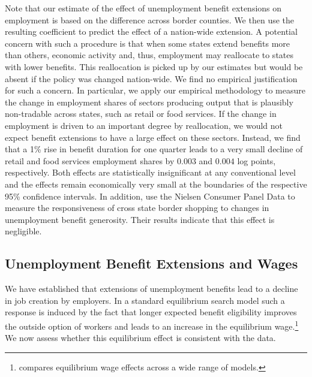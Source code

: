 \documentclass[12pt]{article}
\newcommand{\1}{\mathbf{1}}
\begin{document}
Note that our estimate of the effect of unemployment benefit extensions on employment is based on the difference across border counties. We then use the resulting coefficient to predict the effect of a nation-wide extension. A potential concern with such a procedure is that when some states extend benefits more than others, economic activity and, thus, employment may reallocate to states with lower benefits. This reallocation is picked up by our estimates but would be absent if the policy was changed nation-wide. We find no empirical justification for such a concern. In particular, we apply our empirical methodology to measure the change in employment shares of sectors producing output that is plausibly non-tradable across states, such as retail or food services. If the change in employment is driven to an important degree by reallocation, we would not expect benefit extensions to have a large effect on these sectors. Instead, we find  that a 1\% rise in benefit duration for one quarter leads to a very small decline of retail and food services employment shares by $0.003$ and $0.004$ log points, respectively. Both effects are statistically insignificant at any conventional level and the effects remain economically very small at the boundaries of the respective 95\% confidence intervals. In addition, \citet{hagedorn+handbury+manovskii:15} use the Nielsen Consumer Panel Data to measure the responsiveness of cross state border shopping to changes in unemployment benefit generosity. Their results indicate that this effect is negligible.




\subsection{Unemployment Benefit Extensions and Wages}
\label{sec:wages}

We have established that extensions of unemployment benefits lead to a decline in job creation by employers. In a standard equilibrium search model such a response is induced by the fact that longer expected benefit eligibility improves the outside option of workers and leads to an increase in the equilibrium wage.\footnote{\citet{pissarides:98} compares equilibrium wage effects across a wide range of models.} We now assess whether this equilibrium effect is consistent with the data.
\end{document}
